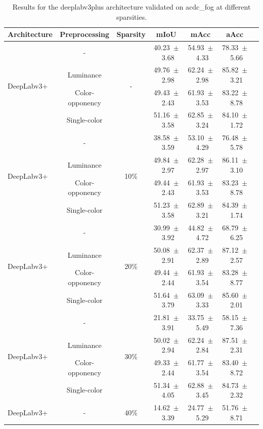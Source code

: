 \begin{table}[h]
\centering
\caption{Results for the deeplabv3plus architecture validated on acdc_fog at different sparsities.}
\begin{tabular}{@{}lccc ccc@{}}
\toprule
Architecture & Preprocessing & Sparsity & mIoU & mAcc & aAcc \\
\midrule

\multirow{4}{*}{DeepLabv3+} & - & \multirow{4}{*}{-} & 40.23~$\pm$~3.68 & 54.93~$\pm$~4.33 & 78.33~$\pm$~5.66 \\
& Luminance & & 49.76~$\pm$~2.98 & 62.24~$\pm$~2.98 & 85.82~$\pm$~3.21 \\
& Color-opponency & & 49.43~$\pm$~2.43 & 61.93~$\pm$~3.53 & 83.22~$\pm$~8.78 \\
& Single-color & & 51.16~$\pm$~3.58 & 62.85~$\pm$~3.24 & 84.10~$\pm$~1.72 \\
\midrule
\multirow{4}{*}{DeepLabv3+} & - & \multirow{4}{*}{10\%} & 38.58~$\pm$~3.59 & 53.10~$\pm$~4.29 & 76.48~$\pm$~5.78 \\
& Luminance & & 49.84~$\pm$~2.97 & 62.28~$\pm$~2.97 & 86.11~$\pm$~3.10 \\
& Color-opponency & & 49.44~$\pm$~2.43 & 61.93~$\pm$~3.53 & 83.23~$\pm$~8.78 \\
& Single-color & & 51.23~$\pm$~3.58 & 62.89~$\pm$~3.21 & 84.39~$\pm$~1.74 \\
\midrule
\multirow{4}{*}{DeepLabv3+} & - & \multirow{4}{*}{20\%} & 30.99~$\pm$~3.92 & 44.82~$\pm$~4.72 & 68.79~$\pm$~6.25 \\
& Luminance & & 50.08~$\pm$~2.91 & 62.37~$\pm$~2.89 & 87.12~$\pm$~2.57 \\
& Color-opponency & & 49.44~$\pm$~2.44 & 61.93~$\pm$~3.54 & 83.28~$\pm$~8.77 \\
& Single-color & & 51.64~$\pm$~3.79 & 63.09~$\pm$~3.33 & 85.60~$\pm$~2.01 \\
\midrule
\multirow{4}{*}{DeepLabv3+} & - & \multirow{4}{*}{30\%} & 21.81~$\pm$~3.91 & 33.75~$\pm$~5.49 & 58.15~$\pm$~7.36 \\
& Luminance & & 50.02~$\pm$~2.94 & 62.24~$\pm$~2.84 & 87.51~$\pm$~2.31 \\
& Color-opponency & & 49.33~$\pm$~2.44 & 61.77~$\pm$~3.54 & 83.40~$\pm$~8.72 \\
& Single-color & & 51.34~$\pm$~4.05 & 62.88~$\pm$~3.45 & 84.73~$\pm$~2.32 \\
\midrule
\multirow{4}{*}{DeepLabv3+} & - & \multirow{4}{*}{40\%} & 14.62~$\pm$~3.39 & 24.77~$\pm$~5.29 & 51.76~$\pm$~8.71 \\

\end{tabular}
\end{table}
